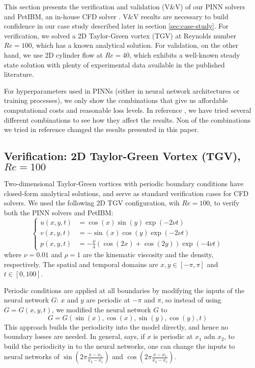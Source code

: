 
This section presents the verification and validation (V\&V) of our PINN solvers and PetIBM, an in-house CFD solver \cite{chuang_petibm_2018}.
V\&V results are necessary to build confidence in our case study described later in section \ref{sec:case-study}.
For verification, we solved a 2D Taylor-Green vortex (TGV) at Reynolds number $Re=\num{100}$, which has a known analytical solution.
For validation, on the other hand, we use 2D cylinder flow at $Re=40$, which exhibits a well-known steady state solution with plenty of experimental data available in the published literature.

For hyperparameters used in PINNs (either in neural network architectures or training processes),
we only show the combinations that give us affordable computational costs and reasonable loss levels.
In reference \cite{chuang_thesis_2023}, we have tried several different combinations to see how they affect the results.
Non of the combinations we tried in reference \cite{chuang_thesis_2023} changed the results presented in this paper.

\subsection{Verification: 2D Taylor-Green Vortex (TGV), $Re=\num{100}$}\label{sec:verification}

Two-dimensional Taylor-Green vortices with periodic boundary conditions have closed-form analytical solutions,
and serve as standard verification cases for CFD solvers.
We used the following 2D TGV configuration, wih $Re=\num{100}$, to verify both the PINN solvers and PetIBM:
\begin{equation}\label{eq:tgv}
    \left\{
        \begin{aligned}
            u(x, y, t) &= \cos(x)\sin(y)\exp(-2 \nu t) \\
            v(x, y, t) &= - \sin(x)\cos(y)\exp(-2 \nu t) \\
            p(x, y, t) &= -\frac{\rho}{4}\left(\cos(2x) + \cos(2y)\right)\exp(-4 \nu t)
        \end{aligned}
    \right.
\end{equation}
where $\nu=\num{0.01}$ and $\rho=\num{1}$ are the kinematic viscosity and the density, respectively.
The spatial and temporal domains are $x, y \in \left[-\pi, \pi\right]$ and $t \in [0, 100]$.

Periodic conditions are applied at all boundaries by modifying the inputs of the neural network $G$: $x$ and $y$ are periodic at $-\pi$ and $\pi$, so instead of using $G=G(x, y, t)$, we modified the neural network $G$ to
\begin{equation}\label{eq:periodic-bc}
    G = G(\sin(x), \cos(x), \sin(y), \cos(y), t)
\end{equation}
This approach builds the periodicity into the model directly, and hence no boundary losses are needed.
In general, says, if $x$ is periodic at $x_1$ adn $x_2$, to build the periodicity in to the neural networks, one can change the inputs to neural networks of $\sin({2\pi\frac{x-x_1}{x_2-x_1}})$ and $\cos({2\pi\frac{x-x_1}{x_2-x_1}})$.

